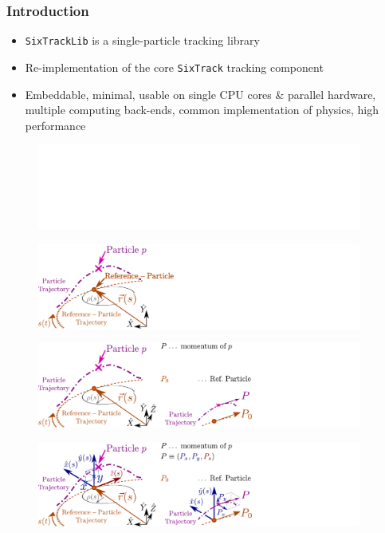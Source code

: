 \documentclass{beamer}
\begin{document}
\begin{frame}
\frametitle{Introduction}
\begin{itemize}
    \item<1-> \texttt{SixTrackLib} is a {\color{MyDarkBlue} single-particle} tracking library
    \item<1-> Re-implementation of the core \texttt{SixTrack} tracking component
    \item<1-> Embeddable, minimal, usable on single CPU cores \& parallel hardware, multiple computing back-ends, common implementation of physics, high performance
\end{itemize}
{
    \begin{figure}[h]
        \centering
        \includegraphics[width=0.95\textwidth]{presentation_images/fig_coordinates_00}
    \end{figure}
}
{
    \begin{figure}[h]
        \centering
        \includegraphics[width=0.95\textwidth]{presentation_images/fig_coordinates_01}
    \end{figure}
}
{
    \begin{figure}[h]
        \centering
        \includegraphics[width=0.95\textwidth]{presentation_images/fig_coordinates_02}
    \end{figure}
}
{
    \begin{figure}[h]
        \centering
        \includegraphics[width=0.95\textwidth]{presentation_images/fig_coordinates_03}

\end{figure}}
\end{frame}
\end{document}
